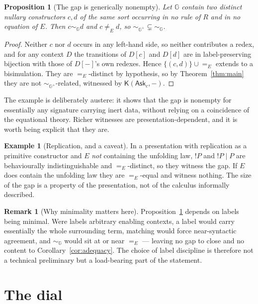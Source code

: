 \documentclass[11pt]{article}
\theoremstyle{plain}
\newtheorem{proposition}[theorem]{Proposition}
\theoremstyle{definition}
\newtheorem{remark}[theorem]{Remark}
\newtheorem{example}[theorem]{Example}
\newcommand{\Kc}{\mathsf{K}}
\newcommand{\Gg}{\mathbb{G}}
\newcommand{\Ask}{\mathsf{Ask}}
\newcommand{\bis}{\sim}
\begin{document}
\begin{proposition}[The gap is generically nonempty]
\label{prop:nonvac}
Let $\Gg$ contain two distinct nullary constructors $c,d$ of the same sort occurring in no rule of $R$
and in no equation of $E$. Then $c \bis_\Gg d$ and $c \neq_E d$, so $\bis_{\Gg^+} \subsetneq \bis_\Gg$.
\end{proposition}

\begin{proof}
Neither $c$ nor $d$ occurs in any left-hand side, so neither contributes a redex, and for any context
$D$ the transitions of $D[c]$ and $D[d]$ are in label-preserving bijection with those of $D[-]$'s own
redexes. Hence $\{(c,d)\} \cup {=_E}$ extends to a bisimulation. They are $=_E$-distinct by hypothesis,
so by Theorem~\ref{thm:main} they are not $\bis_{\Gg^+}$-related, witnessed by $\Kc(\Ask_c,-)$.
\end{proof}

The example is deliberately austere: it shows that the gap is nonempty for essentially any signature
carrying inert data, without relying on a coincidence of the equational theory. Richer witnesses are
presentation-dependent, and it is worth being explicit that they are.

\begin{example}[Replication, and a caveat]
In a presentation with replication as a primitive constructor and $E$ \emph{not} containing the
unfolding law, $!P$ and $!P \mid P$ are behaviourally indistinguishable and $=_E$-distinct, so they
witness the gap. If $E$ does contain the unfolding law they are $=_E$-equal and witness nothing. The
size of the gap is a property of the presentation, not of the calculus informally described.
\end{example}

\begin{remark}[Why minimality matters here]
Proposition~\ref{prop:nonvac} depends on labels being minimal. Were labels arbitrary enabling contexts,
a label would carry essentially the whole surrounding term, matching would force near-syntactic
agreement, and $\bis_\Gg$ would sit at or near $=_E$ --- leaving no gap to close and no content to
Corollary~\ref{cor:adequacy}. The choice of label discipline is therefore not a technical preliminary
but a load-bearing part of the statement.
\end{remark}

\section{The dial}
\label{sec:dial}
\end{document}
